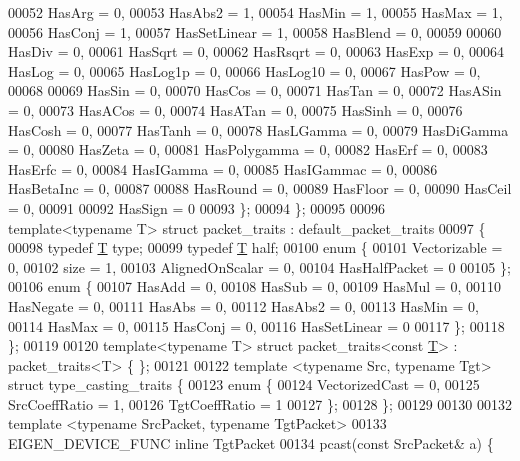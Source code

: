 \begin{DoxyCode}
00052     HasArg    = 0,
00053     HasAbs2   = 1,
00054     HasMin    = 1,
00055     HasMax    = 1,
00056     HasConj   = 1,
00057     HasSetLinear = 1,
00058     HasBlend  = 0,
00059 
00060     HasDiv    = 0,
00061     HasSqrt   = 0,
00062     HasRsqrt  = 0,
00063     HasExp    = 0,
00064     HasLog    = 0,
00065     HasLog1p  = 0,
00066     HasLog10  = 0,
00067     HasPow    = 0,
00068 
00069     HasSin    = 0,
00070     HasCos    = 0,
00071     HasTan    = 0,
00072     HasASin   = 0,
00073     HasACos   = 0,
00074     HasATan   = 0,
00075     HasSinh   = 0,
00076     HasCosh   = 0,
00077     HasTanh   = 0,
00078     HasLGamma = 0,
00079     HasDiGamma = 0,
00080     HasZeta = 0,
00081     HasPolygamma = 0,
00082     HasErf = 0,
00083     HasErfc = 0,
00084     HasIGamma = 0,
00085     HasIGammac = 0,
00086     HasBetaInc = 0,
00087 
00088     HasRound  = 0,
00089     HasFloor  = 0,
00090     HasCeil   = 0,
00091 
00092     HasSign   = 0
00093   \};
00094 \};
00095 
00096 \textcolor{keyword}{template}<\textcolor{keyword}{typename} T> \textcolor{keyword}{struct }packet\_traits : default\_packet\_traits
00097 \{
00098   \textcolor{keyword}{typedef} \hyperlink{group___sparse_core___module_class_eigen_1_1_triplet}{T} type;
00099   \textcolor{keyword}{typedef} \hyperlink{group___sparse_core___module_class_eigen_1_1_triplet}{T} half;
00100   \textcolor{keyword}{enum} \{
00101     Vectorizable = 0,
00102     size = 1,
00103     AlignedOnScalar = 0,
00104     HasHalfPacket = 0
00105   \};
00106   \textcolor{keyword}{enum} \{
00107     HasAdd    = 0,
00108     HasSub    = 0,
00109     HasMul    = 0,
00110     HasNegate = 0,
00111     HasAbs    = 0,
00112     HasAbs2   = 0,
00113     HasMin    = 0,
00114     HasMax    = 0,
00115     HasConj   = 0,
00116     HasSetLinear = 0
00117   \};
00118 \};
00119 
00120 \textcolor{keyword}{template}<\textcolor{keyword}{typename} T> \textcolor{keyword}{struct }packet\_traits<const \hyperlink{group___sparse_core___module_class_eigen_1_1_triplet}{T}> : packet\_traits<T> \{ \};
00121 
00122 \textcolor{keyword}{template} <\textcolor{keyword}{typename} Src, \textcolor{keyword}{typename} Tgt> \textcolor{keyword}{struct }type\_casting\_traits \{
00123   \textcolor{keyword}{enum} \{
00124     VectorizedCast = 0,
00125     SrcCoeffRatio = 1,
00126     TgtCoeffRatio = 1
00127   \};
00128 \};
00129 
00130 
00132 \textcolor{keyword}{template} <\textcolor{keyword}{typename} SrcPacket, \textcolor{keyword}{typename} TgtPacket>
00133 EIGEN\_DEVICE\_FUNC \textcolor{keyword}{inline} TgtPacket
00134 pcast(\textcolor{keyword}{const} SrcPacket& a) \{

\end{DoxyCode}
